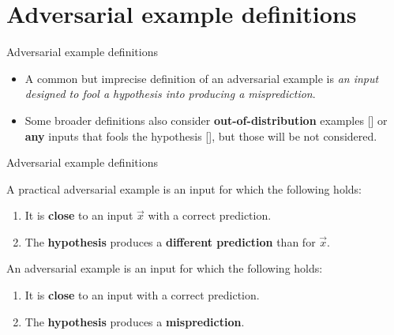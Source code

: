 \documentclass{beamer}
\newcommand{\citep}[1]{{\color{citecolor}\relscale{0.8}[\textcite{#1}]}}
\begin{document}
\section{Adversarial example definitions}

\begin{subframe}[allowframebreaks=0.9]{Adversarial example definitions}
	\begin{itemize}
		\item A common but imprecise definition of an adversarial example is \textit{an input designed to fool a hypothesis into producing a misprediction}.
		\item Some broader definitions also consider \textbf{out-of-distribution} examples \citep{Gal:2018:SCIMHNAETESBNN} or \textbf{any} inputs that fools the hypothesis \citep{Brown:2018:UAE}, but those will be not considered.
	\end{itemize}
\end{subframe}

\begin{frame}[allowframebreaks=0.9]{Adversarial example definitions}
	\begin{definition} \label{def:ae-practical}
		A practical adversarial example is an input for which the following holds:
		\begin{enumerate}
			\item It is \textbf{close} to an input $\vec x$ with a correct prediction.
			\item The \textbf{hypothesis} produces a \textbf{different prediction} than for $\vec x$.
		\end{enumerate}
	\end{definition}
	\begin{definition} \label{def:ae-consistent}
	An adversarial example is an input for which the following holds:
	\begin{enumerate}
		\item It is \textbf{close} to an input with a correct prediction.
		\item The \textbf{hypothesis} produces a \textbf{misprediction}.
	\end{enumerate}
\end{definition}
\end{frame}
\end{document}

